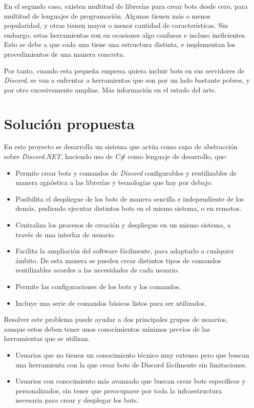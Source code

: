 En el segundo caso, existen multitud de librerías para crear bots desde cero, para multitud de lenguajes de programación. Algunas tienen más o menos popularidad, y otras tienen mayor o menor cantidad de características. Sin embargo, estas herramientas son en ocasiones algo confusas e incluso ineficientes. Esto se debe a que cada una tiene una estructura distinta, e implementan los procedimientos de una manera concreta.

Por tanto, cuando esta pequeña empresa quiera incluir bots en sus servidores de \textit{Discord}, se van a enfrentar a herramientas que son por un lado bastante pobres, y por otro excesivamente amplias. Más información en el estado del arte.

\section{Solución propuesta}

En este proyecto se desarrolla un sistema que actúa como capa de abstracción sobre \textit{Discord.NET}, haciendo uso de \textit{C\#} como lenguaje de desarrollo, que:

\begin{itemize}
	\item Permite crear bots y comandos de \textit{Discord} configurables y reutilizables de manera agnóstica a las librerías y tecnologías que hay por debajo.
	\item Posibilita el despliegue de los bots de manera sencilla e independiente de los demás, pudiendo ejecutar distintos bots en el mismo sistema, o en remotos.
	\item Centraliza los procesos de creación y despliegue en un mismo sistema, a través de una interfaz de usuario.
	\item Facilita la ampliación del software fácilmente, para adaptarlo a cualquier ámbito. De esta manera se pueden crear distintos tipos de comandos reutilizables acordes a las necesidades de cada usuario.
	\item Permite las configuraciones de los bots y los comandos.
	\item Incluye una serie de comandos básicos listos para ser utilizados.
\end{itemize}

Resolver este problema puede ayudar a dos principales grupos de usuarios, aunque estos deben tener unos conocimientos mínimos previos de las herramientas que se utilizan.

\begin{itemize}
	\item Usuarios que no tienen un conocimiento técnico muy extenso pero que buscan una herramienta con la que crear bots de Discord fácilmente sin limitaciones.
	\item Usuarios con conocimiento más avanzado que buscan crear bots específicos y personalizados, sin tener que preocuparse por toda la infraestructura necesaria para crear y desplegar los bots.
\end{itemize}

